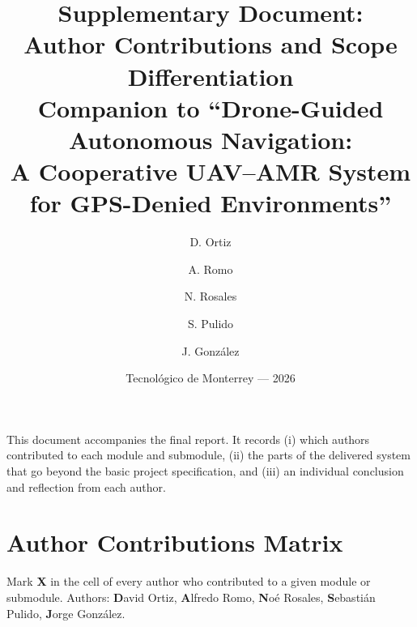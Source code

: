 \documentclass[11pt]{article}
\title{\vspace{-1.5em}Supplementary Document:\\
Author Contributions and Scope Differentiation\\
\large Companion to ``Drone-Guided Autonomous Navigation:\\
A Cooperative UAV--AMR System for GPS-Denied Environments''}
\author{D. Ortiz \and A. Romo \and N. Rosales \and S. Pulido \and J. González}
\date{Tecnológico de Monterrey --- 2026}
\begin{document}
\maketitle

\noindent
This document accompanies the final report. It records (i) which authors
contributed to each module and submodule, (ii) the parts of the delivered system
that go beyond the basic project specification, and (iii) an individual
conclusion and reflection from each author.

\section{Author Contributions Matrix}
Mark \textbf{X} in the cell of every author who contributed to a given module or
submodule. Authors: \textbf{D}avid Ortiz, \textbf{A}lfredo Romo,
\textbf{N}oé Rosales, \textbf{S}ebastián Pulido, \textbf{J}orge González.
\end{document}
